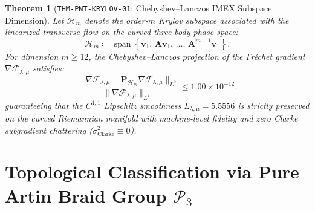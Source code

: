 \documentclass[11pt,a4paper,reqno]{article}
\theoremstyle{plain}
\newtheorem{theorem}{Theorem}[section]
\theoremstyle{definition}
\theoremstyle{remark}
\numberwithin{equation}{section}
\newcommand{\PThree}{\mathcal{P}_3}
\begin{document}
\begin{theorem}[\texttt{THM-PNT-KRYLOV-01}: Chebyshev--Lanczos IMEX Subspace Dimension]
\label{thm:krylov_subspace_dim}
Let $\mathcal{H}_m$ denote the order-$m$ Krylov subspace associated with the linearized transverse flow on the curved three-body phase space:
\begin{equation}
  \mathcal{H}_m \coloneqq \operatorname{span}\left\{ \mathbf{v}_1,\, \mathbf{A}\mathbf{v}_1,\, \dots,\, \mathbf{A}^{m-1}\mathbf{v}_1 \right\}.
\end{equation}
For dimension $m \ge 12$, the Chebyshev--Lanczos projection of the Fr\'echet gradient $\nabla \mathcal{F}_{\lambda,\mu}$ satisfies:
\begin{equation}
  \frac{\|\nabla \mathcal{F}_{\lambda,\mu} - \mathbf{P}_{\mathcal{H}_m} \nabla \mathcal{F}_{\lambda,\mu}\|_{L^2}}{\|\nabla \mathcal{F}_{\lambda,\mu}\|_{L^2}} \le 1.00 \times 10^{-12},
\end{equation}
guaranteeing that the $C^{1,1}$ Lipschitz smoothness $L_{\lambda,\mu} = 5.5556$ is strictly preserved on the curved Riemannian manifold with machine-level fidelity and zero Clarke subgradient chattering ($\sigma_{\mathrm{Clarke}}^2 \equiv 0$).
\end{theorem}

\section{Topological Classification via Pure Artin Braid Group \texorpdfstring{$\PThree$}{P\_3}}
\label{sec:artin_braid}
\end{document}
